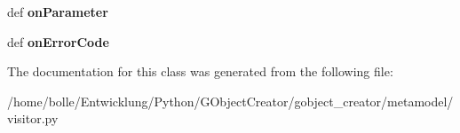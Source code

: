 \begin{DoxyCompactItemize}
\item 
\hypertarget{classgobject__creator_1_1metamodel_1_1visitor_1_1IPackageVisitor_ae5ab5aec420f5e2b007b18a7455f775f}{
def {\bfseries onParameter}}
\label{classgobject__creator_1_1metamodel_1_1visitor_1_1IPackageVisitor_ae5ab5aec420f5e2b007b18a7455f775f}

\item 
\hypertarget{classgobject__creator_1_1metamodel_1_1visitor_1_1IPackageVisitor_a2fb50fb57c55f4baf54362d368448e35}{
def {\bfseries onErrorCode}}
\label{classgobject__creator_1_1metamodel_1_1visitor_1_1IPackageVisitor_a2fb50fb57c55f4baf54362d368448e35}

\end{DoxyCompactItemize}


The documentation for this class was generated from the following file:\begin{DoxyCompactItemize}
\item 
/home/bolle/Entwicklung/Python/GObjectCreator/gobject\_\-creator/metamodel/visitor.py\end{DoxyCompactItemize}
